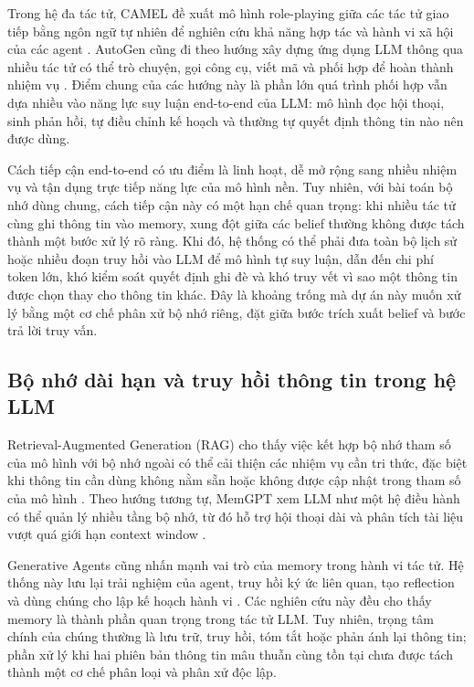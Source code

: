 \documentclass[12pt,a4paper]{article}
\begin{document}
Trong hệ đa tác tử, CAMEL đề xuất mô hình role-playing giữa các tác tử giao tiếp bằng ngôn ngữ tự nhiên để nghiên cứu khả năng hợp tác và hành vi xã hội của các agent \cite{camel2023}. AutoGen cũng đi theo hướng xây dựng ứng dụng LLM thông qua nhiều tác tử có thể trò chuyện, gọi công cụ, viết mã và phối hợp để hoàn thành nhiệm vụ \cite{autogen2023}. Điểm chung của các hướng này là phần lớn quá trình phối hợp vẫn dựa nhiều vào năng lực suy luận end-to-end của LLM: mô hình đọc hội thoại, sinh phản hồi, tự điều chỉnh kế hoạch và thường tự quyết định thông tin nào nên được dùng.

Cách tiếp cận end-to-end có ưu điểm là linh hoạt, dễ mở rộng sang nhiều nhiệm vụ và tận dụng trực tiếp năng lực của mô hình nền. Tuy nhiên, với bài toán bộ nhớ dùng chung, cách tiếp cận này có một hạn chế quan trọng: khi nhiều tác tử cùng ghi thông tin vào memory, xung đột giữa các belief thường không được tách thành một bước xử lý rõ ràng. Khi đó, hệ thống có thể phải đưa toàn bộ lịch sử hoặc nhiều đoạn truy hồi vào LLM để mô hình tự suy luận, dẫn đến chi phí token lớn, khó kiểm soát quyết định ghi đè và khó truy vết vì sao một thông tin được chọn thay cho thông tin khác. Đây là khoảng trống mà dự án này muốn xử lý bằng một cơ chế phân xử bộ nhớ riêng, đặt giữa bước trích xuất belief và bước trả lời truy vấn.

\subsection{Bộ nhớ dài hạn và truy hồi thông tin trong hệ LLM}

Retrieval-Augmented Generation (RAG) cho thấy việc kết hợp bộ nhớ tham số của mô hình với bộ nhớ ngoài có thể cải thiện các nhiệm vụ cần tri thức, đặc biệt khi thông tin cần dùng không nằm sẵn hoặc không được cập nhật trong tham số của mô hình \cite{lewis2020rag}. Theo hướng tương tự, MemGPT xem LLM như một hệ điều hành có thể quản lý nhiều tầng bộ nhớ, từ đó hỗ trợ hội thoại dài và phân tích tài liệu vượt quá giới hạn context window \cite{packer2023memgpt}.

Generative Agents cũng nhấn mạnh vai trò của memory trong hành vi tác tử. Hệ thống này lưu lại trải nghiệm của agent, truy hồi ký ức liên quan, tạo reflection và dùng chúng cho lập kế hoạch hành vi \cite{park2023generative}. Các nghiên cứu này đều cho thấy memory là thành phần quan trọng trong tác tử LLM. Tuy nhiên, trọng tâm chính của chúng thường là lưu trữ, truy hồi, tóm tắt hoặc phản ánh lại thông tin; phần xử lý khi hai phiên bản thông tin mâu thuẫn cùng tồn tại chưa được tách thành một cơ chế phân loại và phân xử độc lập.
\end{document}
